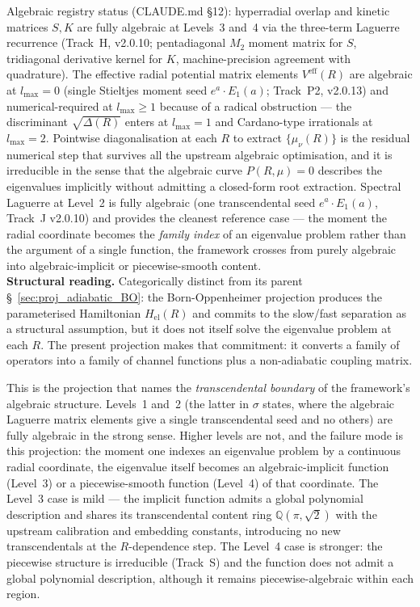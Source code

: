 \documentclass[11pt]{article}
\begin{document}
Algebraic registry status (CLAUDE.md §12): hyperradial overlap and
kinetic matrices $S, K$ are fully algebraic at Levels~3 and~4 via the
three-term Laguerre recurrence (Track~H, v2.0.10; pentadiagonal $M_2$
moment matrix for $S$, tridiagonal derivative kernel for $K$,
machine-precision agreement with quadrature).  The effective radial
potential matrix elements $V^\text{eff}(R)$ are algebraic at
$l_\text{max} = 0$ (single Stieltjes moment seed $e^a \cdot E_1(a)$;
Track~P2, v2.0.13) and numerical-required at $l_\text{max} \geq 1$
because of a radical obstruction --- the discriminant $\sqrt{\Delta(R)}$
enters at $l_\text{max}=1$ and Cardano-type irrationals at
$l_\text{max}=2$.  Pointwise diagonalisation at each $R$ to extract
$\{\mu_\nu(R)\}$ is the residual numerical step that survives all the
upstream algebraic optimisation, and it is irreducible in the sense
that the algebraic curve $P(R, \mu) = 0$ describes the eigenvalues
implicitly without admitting a closed-form root extraction.  Spectral
Laguerre at Level~2 is fully algebraic (one transcendental seed
$e^a \cdot E_1(a)$, Track~J v2.0.10) and provides the cleanest
reference case --- the moment the radial coordinate becomes the
\emph{family index} of an eigenvalue problem rather than the argument
of a single function, the framework crosses from purely algebraic
into algebraic-implicit or piecewise-smooth content.\\
\textbf{Structural reading.}  Categorically distinct from its parent
\S~\ref{sec:proj_adiabatic_BO}: the Born-Oppenheimer projection
produces the parameterised Hamiltonian $H_\text{el}(R)$ and commits to
the slow/fast separation as a structural assumption, but it does not
itself solve the eigenvalue problem at each $R$.  The present
projection makes that commitment: it converts a family of operators
into a family of channel functions plus a non-adiabatic coupling
matrix.

This is the projection that names the \emph{transcendental boundary}
of the framework's algebraic structure.  Levels~1 and~2 (the latter
in $\sigma$ states, where the algebraic Laguerre matrix elements give
a single transcendental seed and no others) are fully algebraic in
the strong sense.  Higher levels are not, and the failure mode is
this projection: the moment one indexes an eigenvalue problem by a
continuous radial coordinate, the eigenvalue itself becomes an
algebraic-implicit function (Level~3) or a piecewise-smooth function
(Level~4) of that coordinate.  The Level~3 case is mild --- the
implicit function admits a global polynomial description and shares
its transcendental content ring $\mathbb{Q}(\pi, \sqrt{2})$ with the
upstream calibration and embedding constants, introducing no new
transcendentals at the $R$-dependence step.  The Level~4 case is
stronger: the piecewise structure is irreducible (Track~S) and the
function does not admit a global polynomial description, although it
remains piecewise-algebraic within each region.
\end{document}
